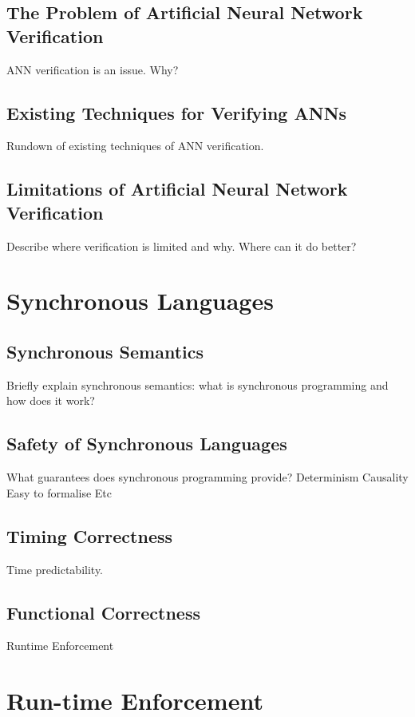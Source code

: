\subsection{The Problem of Artificial Neural Network Verification}
ANN verification is an issue. Why?

\subsection{Existing Techniques for Verifying ANNs}
Rundown of existing techniques of ANN verification.

\subsection{Limitations of Artificial Neural Network Verification}
Describe where verification is limited and why.
Where can it do better?





\section{Synchronous Languages}
\subsection{Synchronous Semantics}
Briefly explain synchronous semantics: what is synchronous programming and how does it work?

\subsection{Safety of Synchronous Languages}
What guarantees does synchronous programming provide?
Determinism
Causality
Easy to formalise
Etc

\subsection{Timing Correctness}
Time predictability.

\subsection{Functional Correctness}
Runtime Enforcement






\section{Run-time Enforcement}
